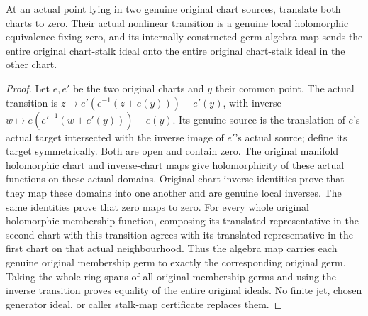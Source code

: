 \begin{lemma}
\label{hir:actual-translated-chart-whole-stalk-transition}
\leanok
{}
At an actual point lying in two genuine original chart sources, translate
both charts to zero. Their actual nonlinear transition is a genuine local
holomorphic equivalence fixing zero, and its internally constructed germ
algebra map sends the entire original chart-stalk ideal onto the entire
original chart-stalk ideal in the other chart.
\end{lemma}
\begin{proof}
Let $e,e'$ be the two original charts and $y$ their common point. The actual
transition is
$z\mapsto e'(e^{-1}(z+e(y)))-e'(y)$, with inverse
$w\mapsto e(e'^{-1}(w+e'(y)))-e(y)$. Its genuine source is the translation
of $e$'s actual target intersected with the inverse image of $e'$'s actual
source; define its target symmetrically. Both are open and contain zero.
The original manifold holomorphic chart and inverse-chart maps give
holomorphicity of these actual functions on these actual domains. Original
chart inverse identities prove that they map these domains into one another
and are genuine local inverses. The same identities prove that zero maps
to zero. For every whole original holomorphic membership function, composing
its translated representative in the second chart with this transition
agrees with its translated representative in the first chart on that actual
neighbourhood. Thus the algebra map carries each genuine original
membership germ to exactly the corresponding original germ. Taking the
whole ring spans of all original membership germs and using the inverse
transition proves equality of the entire original ideals. No finite jet,
chosen generator ideal, or caller stalk-map certificate replaces them.
\end{proof}

